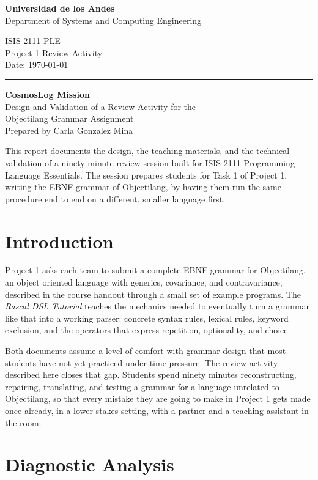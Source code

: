 \documentclass[11pt]{article}
\title{\vspace{-2.5cm}}
\date{}
\newcommand{\coverheader}{%
  \begin{minipage}[t]{0.55\textwidth}
    {\Large\bfseries Universidad de los Andes}\\[2pt]
    {\normalsize Department of Systems and Computing Engineering}
  \end{minipage}%
  \hfill
  \begin{minipage}[t]{0.4\textwidth}
    \raggedleft
    ISIS-2111 PLE\\
    Project 1 Review Activity\\
    Date: \today
  \end{minipage}
  \par\noindent\rule{\textwidth}{0.6pt}
}
\begin{document}
\thispagestyle{empty}
\coverheader

\vspace{1.2cm}
\begin{center}
  {\LARGE\bfseries CosmosLog Mission}\\[6pt]
  {\large Design and Validation of a Review Activity for the\\ Objectilang Grammar Assignment}\\[10pt]
  {\normalsize Prepared by Carla Gonzalez Mina}
\end{center}

\vspace{0.6cm}

\noindent
This report documents the design, the teaching materials, and the technical
validation of a ninety minute review session built for ISIS-2111 Programming
Language Essentials. The session prepares students for Task 1 of Project 1,
writing the EBNF grammar of Objectilang, by having them run the same
procedure end to end on a different, smaller language first.

\vspace{0.4cm}
\tableofcontents

\newpage

\section{Introduction}

Project 1 asks each team to submit a complete EBNF grammar for Objectilang,
an object oriented language with generics, covariance, and contravariance,
described in the course handout through a small set of example programs.
The \emph{Rascal DSL Tutorial} teaches the mechanics needed to eventually
turn a grammar like that into a working parser: concrete syntax rules,
lexical rules, keyword exclusion, and the operators that express repetition,
optionality, and choice.

Both documents assume a level of comfort with grammar design that most
students have not yet practiced under time pressure. The review activity
described here closes that gap. Students spend ninety minutes reconstructing,
repairing, translating, and testing a grammar for a language unrelated to
Objectilang, so that every mistake they are going to make in Project 1 gets
made once already, in a lower stakes setting, with a partner and a teaching
assistant in the room.

\section{Diagnostic Analysis}
\end{document}
